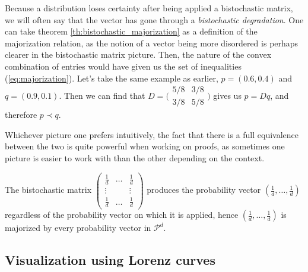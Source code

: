 Because a distribution loses certainty after being applied a bistochastic matrix, we will often say that the vector has gone through a \textit{bistochastic degradation}. One can take theorem \ref{th:bistochastic_majorization} as a definition of the majorization relation, as the notion of a vector being more disordered is perhaps clearer in the bistochastic matrix picture. Then, the nature of the convex combination %
of entries would have given us the set of inequalities (\ref{eq:majorization}). Let's take the same example as earlier, $p = (0.6, 0.4)$ and $q = (0.9, 0.1)$. Then we can find that $D = \Big(\begin{smallmatrix}
                                                                                                    5/8 & 3/8 \\
                                                                                                    3/8 & 5/8
                                                                                                \end{smallmatrix}\Big)$
gives us $p = Dq$, and therefore $p \prec q$.

Whichever picture one prefers intuitively, the fact that there is a full equivalence between the two is quite powerful when working on proofs, as sometimes one picture is easier to work with than the other depending on the context.

\begin{remark}
    The bistochastic matrix $\begin{pmatrix} \frac{1}{d} & \dots & \frac{1}{d} \\
                                                      \vdots & & \vdots \\
                                                      \frac{1}{d} & \dots & \frac{1}{d}
                             \end{pmatrix}$ 
    produces the probability vector $(\frac{1}{d}, \dots, \frac{1}{d})$ regardless of the probability vector on which it is applied, hence $(\frac{1}{d}, \dots, \frac{1}{d})$ is majorized by every probability vector in $\mathcal{P}^d$.
\end{remark}



\subsection{Visualization using Lorenz curves}

